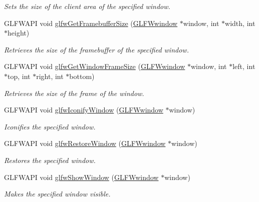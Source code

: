 \begin{DoxyCompactItemize}
\begin{DoxyCompactList}\small\item\em Sets the size of the client area of the specified window. \end{DoxyCompactList}\item 
G\+L\+F\+W\+A\+P\+I void \hyperlink{group__window_gaf7d17f3534b4b6dc9a6f905e3a240b7e}{glfw\+Get\+Framebuffer\+Size} (\hyperlink{group__window_ga3c96d80d363e67d13a41b5d1821f3242}{G\+L\+F\+Wwindow} $\ast$window, int $\ast$width, int $\ast$height)
\begin{DoxyCompactList}\small\item\em Retrieves the size of the framebuffer of the specified window. \end{DoxyCompactList}\item 
G\+L\+F\+W\+A\+P\+I void \hyperlink{group__window_gaad46cdaae2eb732f68d3a1499a7c5409}{glfw\+Get\+Window\+Frame\+Size} (\hyperlink{group__window_ga3c96d80d363e67d13a41b5d1821f3242}{G\+L\+F\+Wwindow} $\ast$window, int $\ast$left, int $\ast$top, int $\ast$right, int $\ast$bottom)
\begin{DoxyCompactList}\small\item\em Retrieves the size of the frame of the window. \end{DoxyCompactList}\item 
G\+L\+F\+W\+A\+P\+I void \hyperlink{group__window_ga24274e3c6ecd44e11fec5e6b66e4d7f3}{glfw\+Iconify\+Window} (\hyperlink{group__window_ga3c96d80d363e67d13a41b5d1821f3242}{G\+L\+F\+Wwindow} $\ast$window)
\begin{DoxyCompactList}\small\item\em Iconifies the specified window. \end{DoxyCompactList}\item 
G\+L\+F\+W\+A\+P\+I void \hyperlink{group__window_ga1e29caf0b819f578b04db52fff17256c}{glfw\+Restore\+Window} (\hyperlink{group__window_ga3c96d80d363e67d13a41b5d1821f3242}{G\+L\+F\+Wwindow} $\ast$window)
\begin{DoxyCompactList}\small\item\em Restores the specified window. \end{DoxyCompactList}\item 
G\+L\+F\+W\+A\+P\+I void \hyperlink{group__window_ga7945bcdff9e5e058cf36505d6873ed8c}{glfw\+Show\+Window} (\hyperlink{group__window_ga3c96d80d363e67d13a41b5d1821f3242}{G\+L\+F\+Wwindow} $\ast$window)
\begin{DoxyCompactList}\small\item\em Makes the specified window visible. \end{DoxyCompactList}\item 

\end{DoxyCompactItemize}
